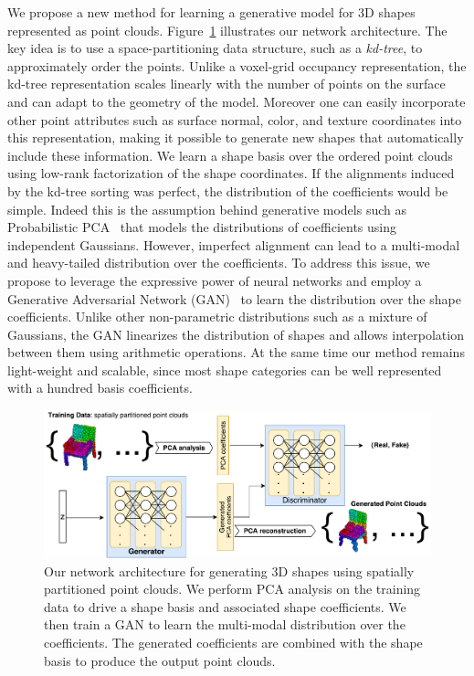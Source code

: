 We propose a new method for learning a generative model for 3D shapes represented as point clouds. Figure~\ref{fig:arch} illustrates our network architecture. 
The key idea is to use a space-partitioning data structure, such as a \emph{kd-tree}, to approximately order the points. 
Unlike a voxel-grid occupancy representation, the kd-tree representation scales linearly with the number of points on the surface and can adapt to the geometry of the model.
Moreover one can easily incorporate other point attributes such as surface normal, color, and texture coordinates into this representation, making it possible to generate new shapes that automatically include these information.
We learn a shape basis over the ordered point clouds using low-rank factorization of the shape coordinates. 
If the alignments induced by the kd-tree sorting was perfect, the distribution of the coefficients would be simple.
Indeed this is the assumption behind generative models such as Probabilistic PCA~\cite{tipping1999probabilistic} that models the distributions of coefficients using independent Gaussians. 
However, imperfect alignment can lead to a multi-modal and heavy-tailed distribution over the coefficients.
To address this issue, we propose to leverage the expressive power of neural networks and employ a Generative Adversarial Network (GAN)~\cite{goodfellow2014generative} to learn the distribution over the shape coefficients.
Unlike other non-parametric distributions such as a mixture of Gaussians, the GAN linearizes the distribution of shapes and allows interpolation between them using arithmetic operations.
At the same time our method remains light-weight and scalable, since most shape categories can be well represented with a hundred basis coefficients.


\begin{figure}
\centering
\includegraphics[width=0.8\linewidth]{PCAGAN/images/PCAGAN_architecture.pdf}
\caption{\small \label{fig:arch} Our network architecture for generating 3D shapes using spatially partitioned point clouds. We perform PCA analysis on the training data to drive a shape basis and associated shape coefficients. We then train a GAN to learn the multi-modal distribution over the coefficients. The generated coefficients are combined with the shape basis to produce the output point clouds.}
\vspace{-12pt}
\end{figure}


